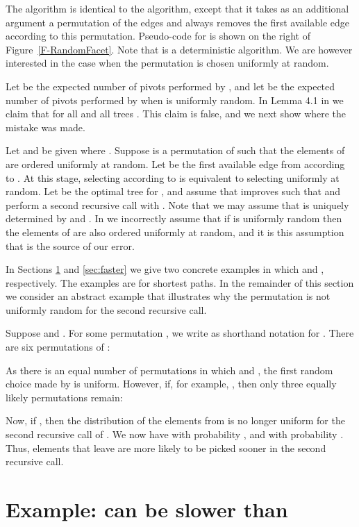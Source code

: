 \documentclass[twoside,11pt]{article}
\begin{document}
The  algorithm is identical to the  algorithm, except that it takes as an additional argument a permutation  of the edges and always removes the first available edge according to this permutation. Pseudo-code for  is shown on the right of Figure~\ref{F-RandomFacet}. Note that  is a deterministic algorithm. We are however interested in the case when the permutation  is chosen uniformly at random.

Let  be the expected number of pivots performed by , and let  be the expected number of pivots performed by  when  is uniformly random.
In Lemma 4.1 in \cite{FriedmannHansenZwick/SODA11} we claim that  for all  and all trees . This claim is false, and we next show where the mistake was made.

Let  and  be given where .
Suppose  is a permutation of  such that the elements of  are ordered uniformly at random. Let  be the first available edge from  according to . At this stage, selecting  according to  is equivalent to selecting  uniformly at random. Let  be the optimal tree for , and assume that  improves  such that  and  perform a second recursive call with . Note that we may assume that  is uniquely determined by  and . In \cite{FriedmannHansenZwick/SODA11} we incorrectly assume that if  is uniformly random then the elements of  are also ordered uniformly at random, and it is this assumption that is the source of our error.

In Sections \ref{sec:slower} and \ref{sec:faster} we give two concrete examples in which  and , respectively. The examples are for shortest paths. In the remainder of this section we consider an abstract example that illustrates why the permutation is not uniformly random for the second recursive call.

Suppose  and . For some permutation , we write  as shorthand notation for . There are six permutations of :

As there is an equal number of permutations in which  and , the first random choice made by  is uniform. However, if, for example, , then only three equally likely permutations remain:

Now, if , then the distribution of the elements from  is no longer uniform for the second recursive call of . We now have  with probability , and
 with probability . Thus, elements that leave  are more likely to be picked sooner in the second recursive call.

\section{Example:  can be slower than }\label{sec:slower}
\end{document}

